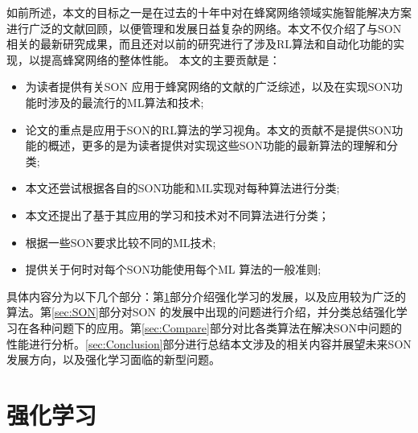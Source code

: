﻿\documentclass[11pt,draftclsnofoot,onecolumn,journal,letterpaper]{IEEEtran}
\begin{document}
如前所述，本文的目标之一是在过去的十年中对在蜂窝网络领域实施智能解决方案进行广泛的文献回顾，以便管理和发展日益复杂的网络。本文不仅介绍了与SON相关的最新研究成果，而且还对以前的研究进行了涉及RL算法和自动化功能的实现，以提高蜂窝网络的整体性能。
本文的主要贡献是：
\begin{itemize}
  \item 为读者提供有关SON 应用于蜂窝网络的文献的广泛综述，以及在实现SON功能时涉及的最流行的ML算法和技术;
  \item 论文的重点是应用于SON的RL算法的学习视角。本文的贡献不是提供SON功能的概述，更多的是为读者提供对实现这些SON功能的最新算法的理解和分类;
  \item 本文还尝试根据各自的SON功能和ML实现对每种算法进行分类;
  \item 本文还提出了基于其应用的学习和技术对不同算法进行分类；
  \item 根据一些SON要求比较不同的ML技术;
  \item 提供关于何时对每个SON功能使用每个ML 算法的一般准则;
\end{itemize}

具体内容分为以下几个部分：第\ref{sec:RL}部分介绍强化学习的发展，以及应用较为广泛的算法。第\ref{sec:SON}部分对SON 的发展中出现的问题进行介绍，并分类总结强化学习在各种问题下的应用。第\ref{sec:Compare}部分对比各类算法在解决SON中问题的性能进行分析。\ref{sec:Conclusion}部分进行总结本文涉及的相关内容并展望未来SON发展方向，以及强化学习面临的新型问题。
\section{强化学习}
\label{sec:RL}
\end{document}
